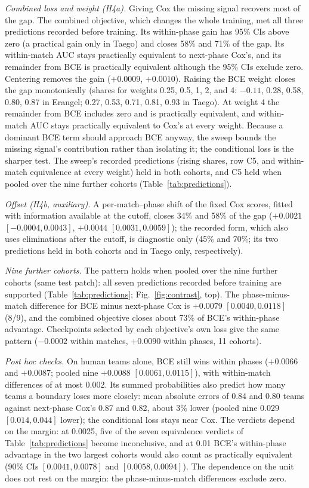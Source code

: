 \documentclass[sigconf,anonymous]{acmart}
\begin{document}
\emph{Combined loss and weight (H4a).} Giving Cox the missing signal recovers most of the gap. The combined objective, which changes the whole training, met all three predictions recorded before training. Its within-phase gain has 95\% CIs above zero (a practical gain only in Taego) and closes 58\% and 71\% of the gap. Its within-match AUC stays practically equivalent to next-phase Cox's, and its remainder from BCE is practically equivalent although the 95\% CIs exclude zero. Centering removes the gain ($+0.0009$, $+0.0010$). Raising the BCE weight closes the gap monotonically (shares for weights 0.25, 0.5, 1, 2, and 4: $-0.11$, 0.28, 0.58, 0.80, 0.87 in Erangel; 0.27, 0.53, 0.71, 0.81, 0.93 in Taego). At weight 4 the remainder from BCE includes zero and is practically equivalent, and within-match AUC stays practically equivalent to Cox's at every weight. Because a dominant BCE term should approach BCE anyway, the sweep bounds the missing signal's contribution rather than isolating it; the conditional loss is the sharper test. The sweep's recorded predictions (rising shares, row C5, and within-match equivalence at every weight) held in both cohorts, and C5 held when pooled over the nine further cohorts (Table~\ref{tab:predictions}).

\emph{Offset (H4b, auxiliary).} A per-match--phase shift of the fixed Cox scores, fitted with information available at the cutoff, closes 34\% and 58\% of the gap ($+0.0021$ $[-0.0004,\allowbreak 0.0043]$, $+0.0044$ $[0.0031,\allowbreak 0.0059]$); the recorded form, which also uses eliminations after the cutoff, is diagnostic only (45\% and 70\%; its two predictions held in both cohorts and in Taego only, respectively).


\emph{Nine further cohorts.} The pattern holds when pooled over the nine further cohorts (same test patch): all seven predictions recorded before training are supported (Table~\ref{tab:predictions}; Fig.~\ref{fig:contrast}, top). The phase-minus-match difference for BCE minus next-phase Cox is $+0.0079$ $[0.0040,\allowbreak 0.0118]$ (8/9), and the combined objective closes about 73\% of BCE's within-phase advantage. Checkpoints selected by each objective's own loss give the same pattern ($-0.0002$ within matches, $+0.0090$ within phases, 11 cohorts).

\emph{Post hoc checks.} On human teams alone, BCE still wins within phases ($+0.0066$ and $+0.0087$; pooled nine $+0.0088$ $[0.0061,\allowbreak 0.0115]$), with within-match differences of at most 0.002. Its summed probabilities also predict how many teams a boundary loses more closely: mean absolute errors of 0.84 and 0.80 teams against next-phase Cox's 0.87 and 0.82, about 3\% lower (pooled nine $0.029$ $[0.014,\allowbreak 0.044]$ lower); the conditional loss stays near Cox. The verdicts depend on the margin: at 0.0025, five of the seven equivalence verdicts of Table~\ref{tab:predictions} become inconclusive, and at 0.01 BCE's within-phase advantage in the two largest cohorts would also count as practically equivalent (90\% CIs $[0.0041,\allowbreak 0.0078]$ and $[0.0058,\allowbreak 0.0094]$). The dependence on the unit does not rest on the margin: the phase-minus-match differences exclude zero.
\end{document}
